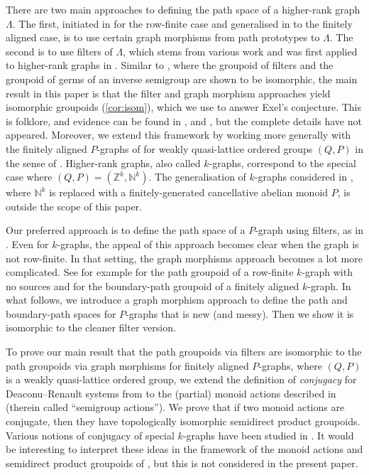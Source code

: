 \documentclass[11pt]{amsart}
\theoremstyle{definition}
\numberwithin{thm}{section}
\numberwithin{equation}{section}
\newcommand{\emphasis}[1]{\textit{#1}}
\newcommand{\Z}{\mathbb{Z}}
\newcommand{\N}{\mathbb{N}}
\begin{document}
There are two main approaches to defining the path space of a higher-rank graph $\Lambda$. 
The first, initiated in \cite{KP00} for the row-finite case and generalised in \cite{Yee07} to the finitely aligned case, is to use certain graph morphisms from path prototypes to $\Lambda$. 
The second is to use filters of $\Lambda$, which stems from various work \cite{Nic92,Exe08,Spi12} and was first applied to higher-rank graphs in \cite{BSV13}. 
Similar to \cite{ACaHJL}, where the groupoid of filters and the groupoid of germs of an inverse semigroup are shown to be isomorphic, the main result in this paper is that the filter and graph morphism approaches yield isomorphic groupoids (\cref{cor:isom}), which we use to answer Exel's conjecture. 
This is folklore, and evidence can be found in \cite[Remarks 2.2]{KP00}, \cite[Page 2763]{PW05} and \cite[Proposition 19.11]{Exe08}, but the complete details have not appeared.
Moreover, we extend this framework by working more generally with the finitely aligned $P$-graphs of \cite{BSV13} for weakly quasi-lattice ordered groups $(Q, P)$ in the sense of \cite{aHNSY21}. 
Higher-rank graphs, also called $k$-graphs, correspond to the special case where $(Q, P) =(\Z^k, \mathbb{N}^k)$. 
The generalisation of $k$-graphs considered in \cite{CKSS14}, where $\N^k$ is replaced with a finitely-generated cancellative abelian monoid $P$, is outside the scope of this paper.

Our preferred approach is to define the path space of a $P$-graph using filters, as in \cite{Jon26}. 
Even for $k$-graphs, the appeal of this approach becomes clear when the graph is not row-finite. 
In that setting, the graph morphisms approach becomes a lot more complicated. 
See for example \cite[Example~5.4]{CP17_Cohn} for the path groupoid of a row-finite $k$-graph with no sources and \cite[Example~5.2]{CP17_KP} for the boundary-path groupoid of a finitely aligned $k$-graph.
In what follows, we introduce a graph morphism approach to define the path and boundary-path spaces for $P$-graphs that is new (and messy). 
Then we show it is isomorphic to the cleaner filter version. 

To prove our main result that the path groupoids via filters are isomorphic to the path groupoids via graph morphisms for finitely aligned $P$-graphs, where $(Q, P)$ is a weakly quasi-lattice ordered group, we extend the definition of \emphasis{conjugacy} for Deaconu--Renault systems from \cite{ABCE23} to the (partial) monoid actions described in \cite{RW17} (therein called ``semigroup actions'').
We prove that if two monoid actions are conjugate, then they have topologically isomorphic semidirect product groupoids.
Various notions of conjugacy of special $k$-graphs have been studied in \cite{CR2021}. 
It would be interesting to interpret these ideas in the framework of the monoid actions and semidirect product groupoids of \cite{RW17}, but this is not considered in the present paper.
\end{document}
